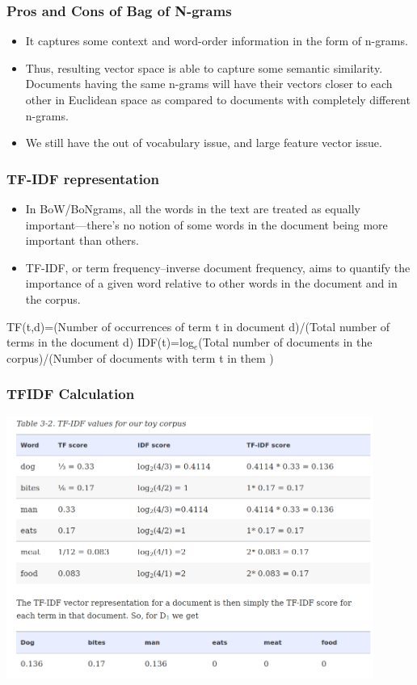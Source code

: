 \documentclass{beamer}
\begin{document}
\begin{frame}
\frametitle{Pros and Cons of Bag of N-grams}
\begin{itemize}
\item It captures some context and word-order information in the form of n-grams.
\item Thus, resulting vector space is able to capture some semantic similarity. Documents having the same n-grams will have their vectors closer to each other in Euclidean space as compared to documents with completely different n-grams. \pause
 \item We still have the out of vocabulary issue, and large feature vector issue. 
\end{itemize}
\end{frame}

\begin{frame}
\frametitle{TF-IDF representation}
\begin{itemize}
\item In BoW/BoNgrams, all the words in the text are treated as equally important—there’s no notion of some words in the document being more important than others.
\item TF-IDF, or term frequency–inverse document frequency, aims to quantify the importance of a given word relative to other words in the document and in the corpus. \pause
\end{itemize}

TF(t,d)=(Number of occurrences of term t in document d)/(Total number of terms in the document d)
IDF(t)=log$_e$(Total number of documents in the corpus)/(Number of documents with term t in them )
\end{frame}

\begin{frame}
\frametitle{TFIDF Calculation}
\includegraphics[width=0.9\textwidth]{figures/tfidf.png}
\end{frame}
\end{document}
